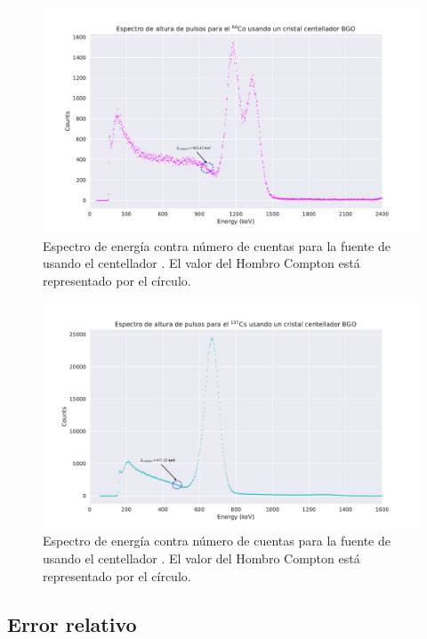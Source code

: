 \documentclass[12pt]{article}
\begin{document}
    \begin{figure}[!htb]
        \centering
        \includegraphics[trim={1cm 0 1cm 0}, clip, scale=0.8]{compton_edge_BGOCo.pdf}
        \caption{Espectro de energía contra número de cuentas para la fuente de  usando el centellador . El valor del Hombro Compton está representado por el círculo.}
        \label{fig:comptonEdgeBGOCo}
    \end{figure}

    \begin{figure}[!htb]
        \centering
        \includegraphics[trim={1cm 0 1cm 0}, clip, scale=0.8]{compton_edge_BGOCs.pdf}
        \caption{Espectro de energía contra número de cuentas para la fuente de  usando el centellador . El valor del Hombro Compton está representado por el círculo.}
        \label{fig:comptonEdgeBGOCs}
    \end{figure}

    \pagebreak
    \subsection*{Error relativo}
\end{document}
